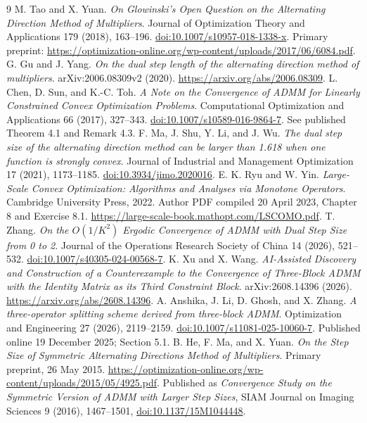 \documentclass[11pt,a4paper]{article}
\theoremstyle{remark}
\begin{document}
{\small
\begin{thebibliography}{9}
\setlength{\itemsep}{1pt}
\setlength{\parskip}{0pt}
 M. Tao and X. Yuan. \emph{On Glowinski's Open Question on the Alternating Direction Method of Multipliers}. Journal of Optimization Theory and Applications 179 (2018), 163--196. \href{https://doi.org/10.1007/s10957-018-1338-x}{doi:10.1007/s10957-018-1338-x}. Primary preprint: \url{https://optimization-online.org/wp-content/uploads/2017/06/6084.pdf}.
 G. Gu and J. Yang. \emph{On the dual step length of the alternating direction method of multipliers}. arXiv:2006.08309v2 (2020). \url{https://arxiv.org/abs/2006.08309}.
 L. Chen, D. Sun, and K.-C. Toh. \emph{A Note on the Convergence of ADMM for Linearly Constrained Convex Optimization Problems}. Computational Optimization and Applications 66 (2017), 327--343. \href{https://doi.org/10.1007/s10589-016-9864-7}{doi:10.1007/s10589-016-9864-7}. See published Theorem 4.1 and Remark 4.3.
 F. Ma, J. Shu, Y. Li, and J. Wu. \emph{The dual step size of the alternating direction method can be larger than 1.618 when one function is strongly convex}. Journal of Industrial and Management Optimization 17 (2021), 1173--1185. \href{https://doi.org/10.3934/jimo.2020016}{doi:10.3934/jimo.2020016}.
 E. K. Ryu and W. Yin. \emph{Large-Scale Convex Optimization: Algorithms and Analyses via Monotone Operators}. Cambridge University Press, 2022. Author PDF compiled 20 April 2023, Chapter 8 and Exercise 8.1. \url{https://large-scale-book.mathopt.com/LSCOMO.pdf}.
 T. Zhang. \emph{On the $O(1/K^2)$ Ergodic Convergence of ADMM with Dual Step Size from 0 to 2}. Journal of the Operations Research Society of China 14 (2026), 521--532. \href{https://doi.org/10.1007/s40305-024-00568-7}{doi:10.1007/s40305-024-00568-7}.
 K. Xu and X. Wang. \emph{AI-Assisted Discovery and Construction of a Counterexample to the Convergence of Three-Block ADMM with the Identity Matrix as its Third Constraint Block}. arXiv:2608.14396 (2026). \url{https://arxiv.org/abs/2608.14396}.
 A. Anshika, J. Li, D. Ghosh, and X. Zhang. \emph{A three-operator splitting scheme derived from three-block ADMM}. Optimization and Engineering 27 (2026), 2119--2159. \href{https://doi.org/10.1007/s11081-025-10060-7}{doi:10.1007/s11081-025-10060-7}. Published online 19 December 2025; Section 5.1.
 B. He, F. Ma, and X. Yuan. \emph{On the Step Size of Symmetric Alternating Directions Method of Multipliers}. Primary preprint, 26 May 2015. \url{https://optimization-online.org/wp-content/uploads/2015/05/4925.pdf}. Published as \emph{Convergence Study on the Symmetric Version of ADMM with Larger Step Sizes}, SIAM Journal on Imaging Sciences 9 (2016), 1467--1501, \href{https://doi.org/10.1137/15M1044448}{doi:10.1137/15M1044448}.
\end{thebibliography}
}
\end{document}
